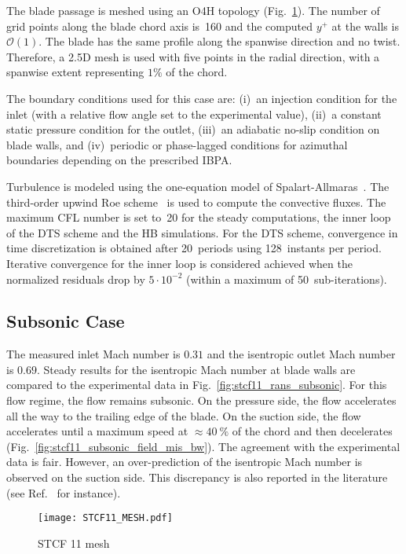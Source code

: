 The blade passage is meshed using an O4H topology (Fig.~\ref{fig:stcf11_mesh}).  
The number of grid points along the blade
chord axis is~160 and the computed $y^+$ at the walls is $\mathcal{O}(1)$. %
The blade has the same profile along the spanwise direction and no
twist. Therefore, a 2.5D mesh is used with five points in the radial direction, with a spanwise
extent representing $1\%$ of the chord. 

The boundary conditions used for this case are: (i)~an
injection condition  for the inlet (with a relative flow angle
set to the  experimental value), (ii)~a constant static pressure
condition for the outlet,  (iii)~an adiabatic no-slip condition on
blade walls, and (iv)~periodic or phase-lagged conditions for azimuthal boundaries depending on the  
prescribed IBPA.

Turbulence is modeled using the one-equation model of
Spalart-Allmaras~\cite{Spalart1992}.  The third-order upwind Roe
scheme~\cite{Roe1981} is used to compute the convective fluxes.
The maximum
CFL number is set to~20 for the steady computations,  the inner loop
of the DTS scheme and the HB simulations.  For the DTS scheme,  
convergence in time discretization is obtained
after 20~periods using 128~instants per period.  Iterative convergence 
for the inner loop is considered achieved when the normalized
residuals drop by $5\cdot 10^{-2}$ (within a maximum of
50~sub-iterations).

\subsection{Subsonic Case}
The measured inlet Mach number is $0.31$ and the isentropic outlet Mach number is $0.69$.
Steady results for the isentropic Mach number at blade walls are compared to the experimental data in 
Fig.~\ref{fig:stcf11_rans_subsonic}.  For this flow regime, the flow
remains subsonic.
On the pressure side, the flow accelerates all the way
to the trailing edge of the blade. On the suction side, the flow
accelerates until a maximum speed at $\approx 40~\%$ of the chord and
then decelerates (Fig.~\ref{fig:stcf11_subsonic_field_mis_bw}).
The agreement with the experimental data is fair. However, an
over-prediction of the isentropic Mach number is observed on the suction
side.  This discrepancy is also reported in the literature (see
Ref.~\cite{Fransson:1999uq} for instance).
\begin{figure}[htb]
  \centering
  \texttt{[image: STCF11\_MESH.pdf]}
  \caption{STCF 11 mesh}
  \label{fig:stcf11_mesh}
\end{figure}

